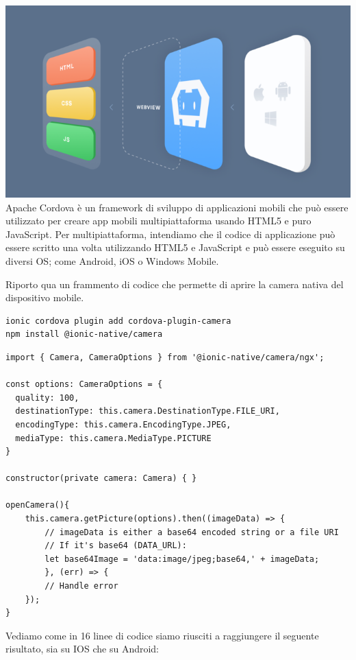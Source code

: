 \includegraphics[scale=0.80]{img/cap2/cordova}\\

Apache Cordova è un framework di sviluppo di applicazioni mobili che può essere utilizzato per creare app mobili multipiattaforma usando HTML5 e puro JavaScript. 
Per multipiattaforma, intendiamo che il codice di applicazione può essere scritto una volta utilizzando HTML5 e JavaScript e può essere eseguito su diversi OS; come Android, iOS o Windows Mobile.

Riporto qua un frammento di codice che permette di aprire la camera nativa del dispositivo mobile.

\begin{lstlisting}
ionic cordova plugin add cordova-plugin-camera
npm install @ionic-native/camera
\end{lstlisting}

\begin{lstlisting}
import { Camera, CameraOptions } from '@ionic-native/camera/ngx';

const options: CameraOptions = {
  quality: 100,
  destinationType: this.camera.DestinationType.FILE_URI,
  encodingType: this.camera.EncodingType.JPEG,
  mediaType: this.camera.MediaType.PICTURE
}

constructor(private camera: Camera) { }

openCamera(){
    this.camera.getPicture(options).then((imageData) => {
        // imageData is either a base64 encoded string or a file URI
        // If it's base64 (DATA_URL):
        let base64Image = 'data:image/jpeg;base64,' + imageData;
        }, (err) => {
        // Handle error
    });
}
\end{lstlisting}

Vediamo come in 16 linee di codice siamo riusciti a raggiungere il seguente risultato, sia su IOS che su Android:

